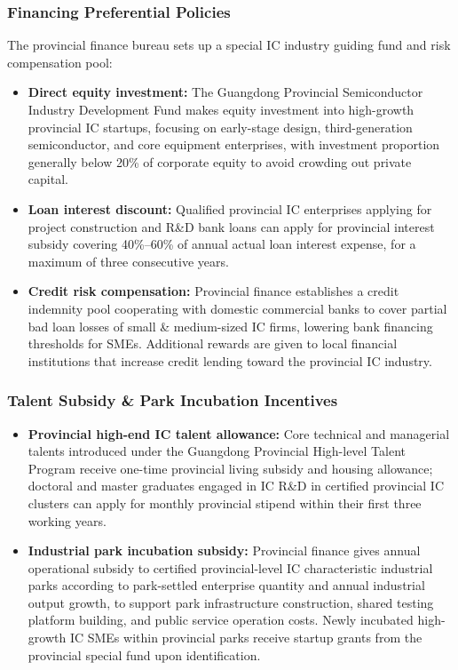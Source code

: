 \documentclass[12pt,a4paper]{article}
\begin{document}
\subsubsection{Financing Preferential Policies}

The provincial finance bureau sets up a special IC industry guiding fund
and risk compensation pool:

\begin{itemize}
    \item \textbf{Direct equity investment:} The Guangdong Provincial
          Semiconductor Industry Development Fund makes equity investment
          into high-growth provincial IC startups, focusing on early-stage
          design, third-generation semiconductor, and core equipment
          enterprises, with investment proportion generally below 20\% of
          corporate equity to avoid crowding out private capital.
    \item \textbf{Loan interest discount:} Qualified provincial IC
          enterprises applying for project construction and R\&D bank
          loans can apply for provincial interest subsidy covering
          40\%--60\% of annual actual loan interest expense, for a
          maximum of three consecutive years.
    \item \textbf{Credit risk compensation:} Provincial finance
          establishes a credit indemnity pool cooperating with domestic
          commercial banks to cover partial bad loan losses of small \&
          medium-sized IC firms, lowering bank financing thresholds for
          SMEs. Additional rewards are given to local financial
          institutions that increase credit lending toward the provincial
          IC industry.
\end{itemize}

\subsubsection{Talent Subsidy \& Park Incubation Incentives}

\begin{itemize}
    \item \textbf{Provincial high-end IC talent allowance:} Core technical
          and managerial talents introduced under the Guangdong Provincial
          High-level Talent Program receive one-time provincial living
          subsidy and housing allowance; doctoral and master graduates
          engaged in IC R\&D in certified provincial IC clusters can
          apply for monthly provincial stipend within their first three
          working years.
    \item \textbf{Industrial park incubation subsidy:} Provincial finance
          gives annual operational subsidy to certified provincial-level
          IC characteristic industrial parks according to park-settled
          enterprise quantity and annual industrial output growth, to
          support park infrastructure construction, shared testing
          platform building, and public service operation costs. Newly
          incubated high-growth IC SMEs within provincial parks receive
          startup grants from the provincial special fund upon
          identification.
\end{itemize}
\end{document}
